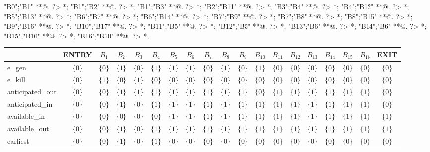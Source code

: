 \begin{scriptsize}
"B0";"B1" **@{.} ?> *{\dir{>}};
"B1";"B2" **@{.} ?> *{\dir{>}};
"B1";"B3" **@{.} ?> *{\dir{>}};
"B2";"B11" **@{.} ?> *{\dir{>}};
"B3";"B4" **@{.} ?> *{\dir{>}};
"B4";"B12" **@{.} ?> *{\dir{>}};
"B5";"B13" **@{.} ?> *{\dir{>}};
"B6";"B7" **@{.} ?> *{\dir{>}};
"B6";"B14" **@{.} ?> *{\dir{>}};
"B7";"B9" **@{.} ?> *{\dir{>}};
"B7";"B8" **@{.} ?> *{\dir{>}};
"B8";"B15" **@{.} ?> *{\dir{>}};
"B9";"B16" **@{.} ?> *{\dir{>}};
"B10";"B17" **@{.} ?> *{\dir{>}};
"B11";"B5" **@{.} ?> *{\dir{>}};
"B12";"B5" **@{.} ?> *{\dir{>}};
"B13";"B6" **@{.} ?> *{\dir{>}};
"B14";"B6" **@{.} ?> *{\dir{>}};
"B15";"B10" **@{.} ?> *{\dir{>}};
"B16";"B10" **@{.} ?> *{\dir{>}};
\endxy
\end{scriptsize}


\begin{table}[ht]
\centering
\begin{tabular}{l|c|c|c|c|c|c|c|c|c|c|c|c|c|c|c|c|c|c}
	& ENTRY & $B_{1}$ & $B_{2}$ & $B_{3}$ & $B_{4}$ & $B_{5}$ & $B_{6}$ & $B_{7}$ & $B_{8}$ & $B_{9}$ & $B_{10}$ & $B_{11}$ & $B_{12}$ & $B_{13}$ & $B_{14}$ & $B_{15}$ & $B_{16}$ & EXIT \\
\hline
e\_gen & $\{0\}$ & $\{0\}$ & $\{1\}$ & $\{0\}$ & $\{1\}$ & $\{1\}$ & $\{1\}$ & $\{0\}$ & $\{1\}$ & $\{0\}$ & $\{1\}$ & $\{0\}$ & $\{0\}$ & $\{0\}$ & $\{0\}$ & $\{0\}$ & $\{0\}$ & $\{0\}$ \\
e\_kill & $\{0\}$ & $\{1\}$ & $\{0\}$ & $\{1\}$ & $\{0\}$ & $\{0\}$ & $\{0\}$ & $\{0\}$ & $\{0\}$ & $\{0\}$ & $\{0\}$ & $\{0\}$ & $\{0\}$ & $\{0\}$ & $\{0\}$ & $\{0\}$ & $\{0\}$ & $\{0\}$ \\
anticipated\_out & $\{0\}$ & $\{0\}$ & $\{1\}$ & $\{1\}$ & $\{1\}$ & $\{1\}$ & $\{1\}$ & $\{1\}$ & $\{1\}$ & $\{1\}$ & $\{0\}$ & $\{1\}$ & $\{1\}$ & $\{1\}$ & $\{1\}$ & $\{1\}$ & $\{1\}$ & $\{0\}$ \\
anticipated\_in & $\{0\}$ & $\{0\}$ & $\{1\}$ & $\{0\}$ & $\{1\}$ & $\{1\}$ & $\{1\}$ & $\{1\}$ & $\{1\}$ & $\{1\}$ & $\{1\}$ & $\{1\}$ & $\{1\}$ & $\{1\}$ & $\{1\}$ & $\{1\}$ & $\{1\}$ & $\{0\}$ \\
available\_in & $\{0\}$ & $\{0\}$ & $\{0\}$ & $\{0\}$ & $\{0\}$ & $\{1\}$ & $\{1\}$ & $\{1\}$ & $\{1\}$ & $\{1\}$ & $\{1\}$ & $\{1\}$ & $\{1\}$ & $\{1\}$ & $\{1\}$ & $\{1\}$ & $\{1\}$ & $\{1\}$ \\
available\_out & $\{0\}$ & $\{0\}$ & $\{1\}$ & $\{0\}$ & $\{1\}$ & $\{1\}$ & $\{1\}$ & $\{1\}$ & $\{1\}$ & $\{1\}$ & $\{1\}$ & $\{1\}$ & $\{1\}$ & $\{1\}$ & $\{1\}$ & $\{1\}$ & $\{1\}$ & $\{1\}$ \\
earliest & $\{0\}$ & $\{0\}$ & $\{1\}$ & $\{0\}$ & $\{1\}$ & $\{0\}$ & $\{0\}$ & $\{0\}$ & $\{0\}$ & $\{0\}$ & $\{0\}$ & $\{0\}$ & $\{0\}$ & $\{0\}$ & $\{0\}$ & $\{0\}$ & $\{0\}$ & $\{0\}$ \\

\end{tabular}
\end{table}
